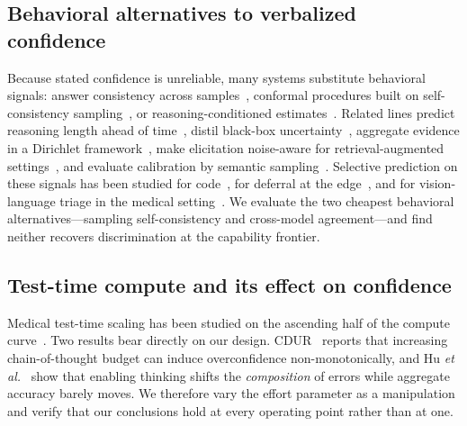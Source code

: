 \documentclass[journal,twoside]{IEEEtran}
\begin{document}
\subsection{Behavioral alternatives to verbalized confidence}
Because stated confidence is unreliable, many systems substitute behavioral signals: answer
consistency across samples~\cite{trac2026}, conformal procedures built on self-consistency
sampling~\cite{conformal2026}, or reasoning-conditioned estimates~\cite{cdur2026}. Related lines predict reasoning length
ahead of time~\cite{fuelgauge2026}, distil black-box uncertainty~\cite{advdistill2026}, aggregate
evidence in a Dirichlet framework~\cite{direag2026}, make elicitation noise-aware for
retrieval-augmented settings~\cite{nova2026}, and evaluate calibration by semantic
sampling~\cite{semsamp2026}. Selective prediction on these signals has been studied for
code~\cite{codeunc2026,sqlsel2026}, for deferral at the edge~\cite{deferedge2026}, and for
vision-language triage in the medical setting~\cite{triage2026}. We evaluate the two cheapest behavioral
alternatives---sampling self-consistency and cross-model agreement---and find neither recovers
discrimination at the capability frontier.

\subsection{Test-time compute and its effect on confidence}
Medical test-time scaling has been studied on the ascending half of the compute
curve~\cite{m1_2025,ttsmed2025}. Two results bear directly on our design. CDUR~\cite{cdur2026}
reports that increasing chain-of-thought budget can induce overconfidence non-monotonically, and
Hu \emph{et al.}~\cite{thinkshift2026} show that enabling thinking shifts the \emph{composition} of
errors while aggregate accuracy barely moves. We therefore vary the effort parameter as a
manipulation and verify that our conclusions hold at every operating point rather than at one.
\end{document}
